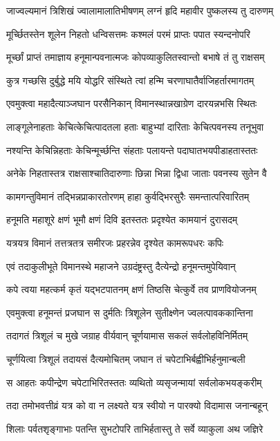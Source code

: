 \twolineshloka
{जाज्वल्यमानं त्रिशिखं ज्वालामालातिभीषणम्}
{लग्नं हृदि महावीर पुष्कलस्य तु दारुणम्}%

\twolineshloka
{मूर्च्छितस्तेन शूलेन निहतो धन्विसत्तमः}
{कश्मलं परमं प्राप्तः पपात स्यन्दनोपरि}%

\twolineshloka
{मूर्च्छां प्राप्तं तमाज्ञाय हनूमान्पवनात्मजः}
{कोपव्याकुलितस्वान्तो बभाषे तं तु राक्षसम्}%

\twolineshloka
{कुत्र गच्छसि दुर्बुद्धे मयि योद्धरि संस्थिते}
{त्वां हन्मि चरणाघातैर्वाजिहर्तारमागतम्}%

\twolineshloka
{एवमुक्त्वा महादैत्याञ्जघान परसैनिकान्}
{विमानस्थान्नखाग्रेण दारयन्नभसि स्थितः}%

\twolineshloka
{लाङ्गूलेनाहताः केचित्केचित्पादतला हताः}
{बाहुभ्यां दारिताः केचित्पवनस्य तनूभुवा}%

\twolineshloka
{नश्यन्ति केचिन्निहताः केचिन्मूर्च्छन्ति संहताः}
{पलायन्ते पदाघातभयपीडाहतास्ततः}%

\twolineshloka
{अनेके निहतास्तत्र राक्षसाश्चातिदारुणाः}
{छिन्ना भिन्ना द्विधा जाताः पवनस्य सुतेन वै}%

\twolineshloka
{कामगन्तुविमानं तद्भिन्नप्राकारतोरणम्}
{हाहा कुर्वद्भिरसुरैः समन्तात्परिवारितम्}%

\twolineshloka
{हनूमति महाशूरे क्षणं भूमौ क्षणं दिवि}
{इतस्ततः प्रदृश्येत कामयानं दुरासदम्}%

\twolineshloka
{यत्रयत्र विमानं तत्तत्रतत्र समीरजः}
{प्रहरन्नेव दृश्येत कामरूपधरः कपिः}%

\twolineshloka
{एवं तदाकुलीभूते विमानस्थे महाजने}
{उग्रदंष्ट्रस्तु दैत्येन्द्रो हनूमन्तमुपेयिवान्}%

\twolineshloka
{कपे त्वया महत्कर्म कृतं यद्भटपातनम्}
{क्षणं तिष्ठसि चेत्कुर्वे तव प्राणवियोजनम्}%

\twolineshloka
{एवमुक्त्वा हनूमन्तं प्रजघान स दुर्मतिः}
{त्रिशूलेन सुतीक्ष्णेन ज्वलत्पावककान्तिना}%

\twolineshloka
{तदागतं त्रिशूलं च मुखे जग्राह वीर्यवान्}
{चूर्णयामास सकलं सर्वलोहविनिर्मितम्}%

\twolineshloka
{चूर्णयित्वा त्रिशूलं तदायसं दैत्यमोचितम्}
{जघान तं चपेटाभिर्बह्वीभिर्हनुमान्बली}%

\twolineshloka
{स आहतः कपीन्द्रेण चपेटाभिरितस्ततः}
{व्यथितो व्यसृजन्मायां सर्वलोकभयङ्करीम्}%

\twolineshloka
{तदा तमोभवत्तीव्रं यत्र को वा न लक्ष्यते}
{यत्र स्वीयो न पारक्यो विदामास जनान्बहून्}%

\twolineshloka
{शिलाः पर्वतशृङ्गाभाः पतन्ति सुभटोपरि}
{ताभिर्हतास्तु ते सर्वे व्याकुला अथ जज्ञिरे}%


